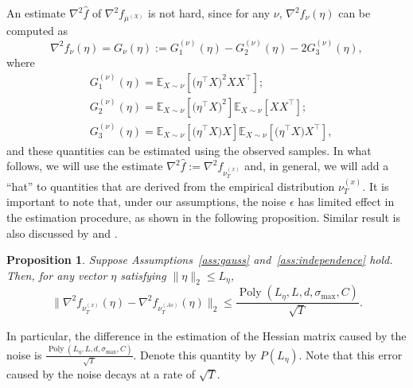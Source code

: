 \documentclass[jmlr]{article}
\newcommand{\E}{\mathbb{E}}
\DeclareMathOperator{\pol}{Poly}
\newcommand{\poly}[1]{\pol\left(#1\right)}
\newtheorem{prop}[lemma]{Proposition}
\theoremstyle{definition}
\begin{document}
An estimate $\nabla^2 \hat{f}$ of $\nabla^2f_{\mu^{(X)}}$ is not hard, since for any $\nu$,
$\nabla^2f_{\nu}(\eta)$  can be computed as
\begin{equation}
\label{eq:G}
\nabla^2 f_{\nu}(\eta) = G_{\nu}(\eta):= G_1^{(\nu)}(\eta) - G_2^{(\nu)}(\eta) -2G_3^{(\nu)}(\eta),
\end{equation}
where 
\vspace{-3mm}
\begin{align*}
& G_1^{(\nu)}(\eta) =  \E_{X\sim \nu} [\big(\eta^{\top}X\big)^2XX^{\top}]; \\
& G_2^{(\nu)}(\eta) = \E_{X\sim \nu} [\big(\eta^{\top}X\big)^2] \E_{X\sim \nu} [XX^{\top}]; \\
& G_3^{(\nu)}(\eta) = \E_{X\sim \nu} [\big(\eta^{\top}X\big)X] \E_{X\sim \nu} [\big(\eta^{\top}X\big)X^{\top}],
\end{align*} 
and these quantities can be estimated using the observed samples. In what follows, we will use the estimate $\nabla^2 \hat{f}:=\nabla^2 f_{\nu_T^{(x)}}$ and, in general, we will add a ``hat'' to quantities that are derived from the empirical distribution $\nu_T^{(x)}$. 
It is important to note that, under our assumptions, the noise $\epsilon$ has limited effect in the estimation procedure, as shown in the following proposition. Similar result is also discussed by \citet{arora2012provable} and \citet{belkin2013blind}.
\begin{prop}
 \label{prop:denoise}
 Suppose Assumptions~\ref{ass:gauss} and~\ref{ass:independence} hold. Then,
for any vector $\eta$ satisfying $\|\eta\|_2\le L_{\eta}$,
\[
\| \nabla^2f_{\nu_T^{(x)}}(\eta) - \nabla^2f_{\nu_T^{(As)}}(\eta) \|_2 \le \frac{\poly{L_{\eta}, L, d, \sigma_{\max}, C}}{\sqrt{T}}. 
\] 
\end{prop}

In particular, the difference in the estimation of the Hessian matrix caused by the noise is $\frac{\poly{L_{\eta}, L, d, \sigma_{\max}, C}}{\sqrt{T}}$. Denote this quantity by $P(L_{\eta})$. 
Note that this error caused by the noise decays at a rate of $\sqrt{T}$.
\end{document}
